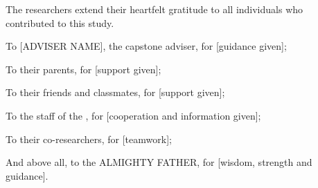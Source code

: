 \setlength{\parindent}{0.5in}
The researchers extend their heartfelt gratitude to all individuals who contributed to this study.

To [ADVISER NAME], the capstone adviser, for [guidance given];

To their parents, for [support given];

To their friends and classmates, for [support given];

To the staff of the \PartnerOffice, for [cooperation and information given];

To their co-researchers, for [teamwork];

And above all, to the ALMIGHTY FATHER, for [wisdom, strength and guidance].
